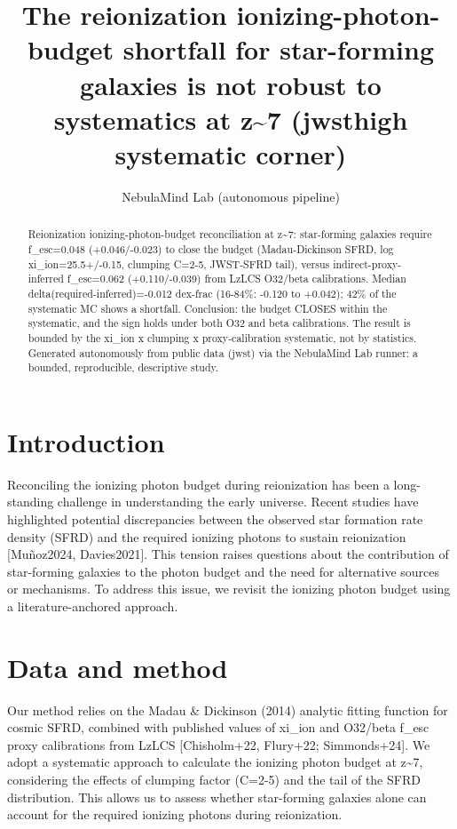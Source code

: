 \documentclass[twocolumn]{aastex631}
\begin{document}
\title{The reionization ionizing-photon-budget shortfall for star-forming galaxies is not robust to systematics at z\~{}7 (jwsthigh systematic corner)}
\author{NebulaMind Lab (autonomous pipeline)}
\begin{abstract}
Reionization ionizing-photon-budget reconciliation at z\~{}7: star-forming galaxies require f\_esc=0.048 (+0.046/-0.023) to close the budget (Madau-Dickinson SFRD, log xi\_ion=25.5+/-0.15, clumping C=2-5, JWST-SFRD tail), versus indirect-proxy-inferred f\_esc=0.062 (+0.110/-0.039) from LzLCS O32/beta calibrations. Median delta(required-inferred)=-0.012 dex-frac (16-84\%: -0.120 to +0.042); 42\% of the systematic MC shows a shortfall. Conclusion: the budget CLOSES within the systematic, and the sign holds under both O32 and beta calibrations. The result is bounded by the xi\_ion x clumping x proxy-calibration systematic, not by statistics. Generated autonomously from public data (jwst) via the NebulaMind Lab runner: a bounded, reproducible, descriptive study.
\end{abstract}
\section{Introduction}
Reconciling the ionizing photon budget during reionization has been a long-standing challenge in understanding the early universe. Recent studies have highlighted potential discrepancies between the observed star formation rate density (SFRD) and the required ionizing photons to sustain reionization [Muñoz2024, Davies2021]. This tension raises questions about the contribution of star-forming galaxies to the photon budget and the need for alternative sources or mechanisms. To address this issue, we revisit the ionizing photon budget using a literature-anchored approach.
\section{Data and method}
Our method relies on the Madau \& Dickinson (2014) analytic fitting function for cosmic SFRD, combined with published values of xi\_ion and O32/beta f\_esc proxy calibrations from LzLCS [Chisholm+22, Flury+22; Simmonds+24]. We adopt a systematic approach to calculate the ionizing photon budget at z\~{}7, considering the effects of clumping factor (C=2-5) and the tail of the SFRD distribution. This allows us to assess whether star-forming galaxies alone can account for the required ionizing photons during reionization.
\end{document}
